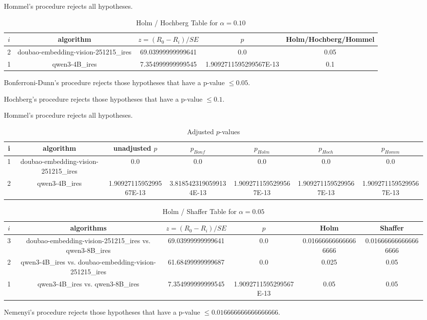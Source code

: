 \documentclass[a4paper,10pt]{article}
\begin{document}
\begin{landscape}
Hommel's procedure rejects all hypotheses.


\begin{table}[!htp]
\centering\tiny
\caption{Holm / Hochberg Table for $\alpha=0.10$}
\begin{tabular}{ccccc}
$i$&algorithm&$z=(R_0 - R_i)/SE$&$p$&Holm/Hochberg/Hommel\\
\hline
2&doubao-embedding-vision-251215_ires&69.03999999999641&0.0&0.05\\
1&qwen3-4B_ires&7.354999999999545&1.9092711595299567E-13&0.1\\
\hline
\end{tabular}
\end{table}
Bonferroni-Dunn's procedure rejects those hypotheses that have a p-value $\le0.05$.


Hochberg's procedure rejects those hypotheses that have a p-value $\le0.1$.


Hommel's procedure rejects all hypotheses.


\begin{table}[!htp]
\centering\tiny
\caption{Adjusted $p$-values}
\begin{tabular}{ccccccc}
i&algorithm&unadjusted $p$&$p_{Bonf}$&$p_{Holm}$&$p_{Hoch}$&$p_{Homm}$\\
\hline
1&doubao-embedding-vision-251215_ires&0.0&0.0&0.0&0.0&0.0\\
2&qwen3-4B_ires&1.9092711595299567E-13&3.8185423190599134E-13&1.9092711595299567E-13&1.9092711595299567E-13&1.9092711595299567E-13\\
\hline
\end{tabular}
\end{table}

\begin{table}[!htp]
\centering\tiny
\caption{Holm / Shaffer Table for $\alpha=0.05$}
\begin{tabular}{cccccc}
$i$&algorithms&$z=(R_0 - R_i)/SE$&$p$&Holm&Shaffer\\
\hline
3&doubao-embedding-vision-251215_ires vs. qwen3-8B_ires&69.03999999999641&0.0&0.016666666666666666&0.016666666666666666\\2&qwen3-4B_ires vs. doubao-embedding-vision-251215_ires&61.68499999999687&0.0&0.025&0.05\\1&qwen3-4B_ires vs. qwen3-8B_ires&7.354999999999545&1.9092711595299567E-13&0.05&0.05\\\hline
\end{tabular}
\end{table}
Nemenyi's procedure rejects those hypotheses that have a p-value $\le0.016666666666666666$.



\end{landscape}
\end{document}
